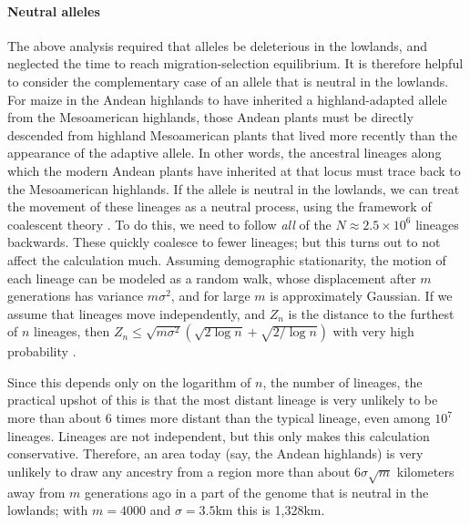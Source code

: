 \paragraph{Neutral alleles}
The above analysis required that alleles be deleterious in the lowlands, 
and neglected the time to reach migration-selection equilibrium.
It is therefore helpful to consider the complementary case of an allele that is neutral in the lowlands.
For maize in the Andean highlands to have inherited a highland-adapted allele from the Mesoamerican highlands, 
those Andean plants must be directly descended from highland Mesoamerican plants that lived more recently than the appearance of the adaptive allele.
In other words, the ancestral lineages along which the modern Andean plants have inherited at that locus must trace back to the Mesoamerican highlands.
If the allele is neutral in the lowlands, we can treat the movement of these lineages as a neutral process, using the framework of coalescent theory 
\citep{wakeley2005coalescent}.
To do this, we need to follow \emph{all} of the $N \approx 2.5 \times 10^6$ lineages backwards.
These quickly coalesce to fewer lineages;
but this turns out to not affect the calculation much.
Assuming demographic stationarity,
the motion of each lineage can be modeled as a random walk,
whose displacement after $m$ generations has variance $m \sigma^2$, and for large $m$ is approximately Gaussian.
If we assume that lineages move independently, 
and $Z_n$ is the distance to the furthest of $n$ lineages, 
then $Z_n \le \sqrt{m \sigma^2} ( \sqrt{2 \log n} + \sqrt{2/\log n} )$ with very high probability
\citep{berman1964limit}. 

Since this depends only on the logarithm of $n$, the number of lineages,
the practical upshot of this is that the most distant lineage
is very unlikely to be more than about 6 times more distant than the typical lineage,
even among $10^7$ lineages.
Lineages are not independent, but this only makes this calculation conservative.
Therefore, an area today (say, the Andean highlands)
is very unlikely to draw any ancestry from a region more than about $6 \sigma \sqrt{m}$ kilometers away from $m$ generations ago
in a part of the genome that is neutral in the lowlands;
with $m=4000$ and $\sigma=3.5$km this is 1,328km.

